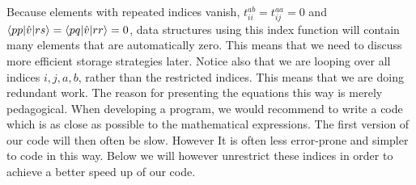   Because elements with repeated indices vanish,
  $t_{ii}^{ab}=t_{ij}^{aa}=0$ and
  $\braket{pp|\hat{v}|rs}=\braket{pq|\hat{v}|rr}=0$, data structures
  using this index function will contain many elements that are
  automatically zero. This means that we need to discuss more efficient storage
  strategies later. Notice also that we are looping over all
  indices $i,j,a,b$, rather than the restricted indices. This means that we
  are doing redundant work. The reason for presenting the equations this way is merely pedagogical. When developing a program, we would recommend to write a code which is as close as possible to the mathematical expressions. The first version of our code will then often be slow. However It is  often less error-prone and simpler to code in this way. 
Below we will however unrestrict these indices in order to achieve a better speed up of our code. 

